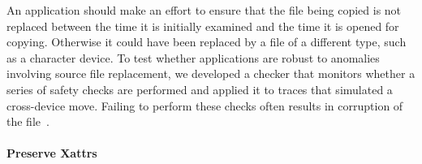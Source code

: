An application should make an effort to ensure that the file being copied is not 
replaced between the time it is initially examined and the time it is opened 
for copying.  Otherwise it could have been replaced by a file of a different
type, such as a character device.
%
To test whether applications are robust to anomalies involving source file replacement,
we developed a checker that monitors whether a series of safety checks
are performed and applied it to traces that simulated a cross-device move.
Failing to perform these checks often results in corruption of the file~\cite{PythonShutilBug}.

\paragraph{Preserve Xattrs}

